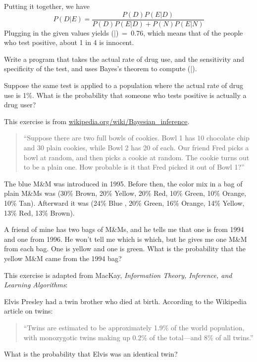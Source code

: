 \documentclass[12pt]{book}
\begin{document}
Putting it together, we have
%
\[ P(D|E) = \frac{P(D) P(E|D)}{P(D) P(E|D) + P(N) P(E|N)}\]
%
Plugging in the given values yields \Prob(\D|\E)~=~0.76, which means
that of the people who test positive, about 1 in 4 is innocent. 

\begin{exercise}
Write a program that takes the actual rate of drug use, and the
sensitivity and specificity of the test, and uses Bayes's theorem
to compute \Prob(\D|\E).

Suppose the same test is applied to a population where the actual
rate of drug use is 1\%.  What is the probability that someone
who tests positive is actually a drug user?

\end{exercise}


\begin{exercise}
This exercise is from \url{wikipedia.org/wiki/Bayesian_inference}.

\begin{quote}

``Suppose there are two full bowls of cookies. Bowl 1 has 10 chocolate
  chip and 30 plain cookies, while Bowl 2 has 20 of each. Our friend
  Fred picks a bowl at random, and then picks a cookie at random. The
  cookie turns out to be a plain one. How probable is it that Fred
  picked it out of Bowl 1?''

\end{quote}

\end{exercise}

\begin{exercise}

The blue M\&M was introduced in 1995.  Before then, the color mix in
a bag of plain M\&Ms was (30\% Brown, 20\% Yellow, 20\% Red, 10\%
Green, 10\% Orange, 10\% Tan).  Afterward it was (24\% Blue , 20\%
Green, 16\% Orange, 14\% Yellow, 13\% Red, 13\% Brown).


A friend of mine has two bags of M\&Ms, and he tells me
that one is from 1994 and one from 1996.  He won't tell me which is
which, but he gives me one M\&M from each bag.  One is yellow and
one is green.  What is the probability that the yellow M\&M came
from the 1994 bag?
  
\end{exercise}

\begin{exercise}
This exercise is adapted from MacKay, {\em Information
  Theory, Inference, and Learning Algorithms}:

Elvis Presley had a twin brother who died at birth.  According to the
Wikipedia article on twins:

\begin{quote}
``Twins are estimated to be approximately 1.9\% of the world population,
with monozygotic twins making up 0.2\% of the total---and 8\% of all
twins.''
\end{quote}

What is the probability that Elvis was an identical twin?

\end{exercise}
\end{document}
